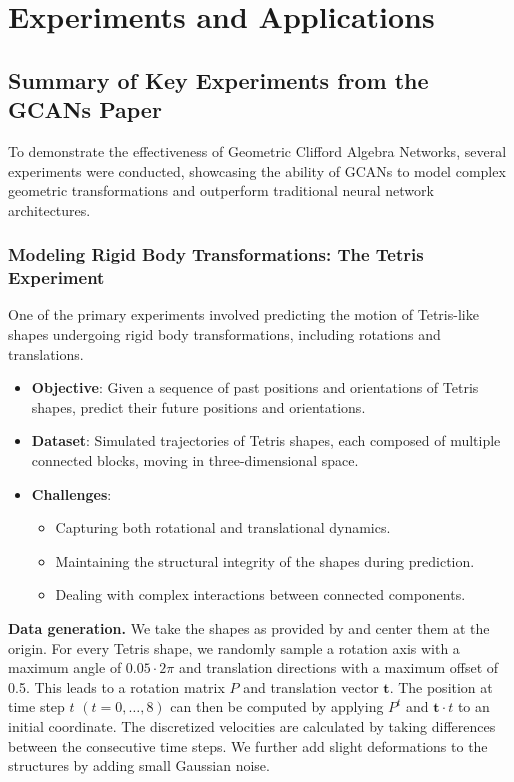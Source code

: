 \documentclass[a4paper,14pt]{article}
\theoremstyle{plain} %
\theoremstyle{definition} %
\theoremstyle{remark} %
\theoremstyle{definition}
\theoremstyle{remark}
\theoremstyle{remark}
\begin{document}
	\section{Experiments and Applications}
	
	\subsection{Summary of Key Experiments from the GCANs Paper}
	
	To demonstrate the effectiveness of Geometric Clifford Algebra Networks, several experiments were conducted, showcasing the ability of GCANs to model complex geometric transformations and outperform traditional neural network architectures.
	
	\subsubsection{Modeling Rigid Body Transformations: The Tetris Experiment}
	
	One of the primary experiments involved predicting the motion of Tetris-like shapes undergoing rigid body transformations, including rotations and translations.
	
	\begin{itemize}
		\item \textbf{Objective}: Given a sequence of past positions and orientations of Tetris shapes, predict their future positions and orientations.
		\item \textbf{Dataset}: Simulated trajectories of Tetris shapes, each composed of multiple connected blocks, moving in three-dimensional space.
		\item \textbf{Challenges}:
		\begin{itemize}
			\item Capturing both rotational and translational dynamics.
			\item Maintaining the structural integrity of the shapes during prediction.
			\item Dealing with complex interactions between connected components.
		\end{itemize}
	\end{itemize}
	
	\textbf{Data generation.} We take the shapes as provided by \cite{Thomas2018} and center them at the origin. For every Tetris shape, we randomly sample a rotation axis with a maximum angle of $0.05 \cdot 2\pi$ and translation directions with a maximum offset of 0.5. This leads to a rotation matrix $P$ and translation vector $\mathbf{t}$. The position at time step $t$ $(t = 0, \dots, 8)$ can then be computed by applying $P^t$ and $\mathbf{t} \cdot t$ to an initial coordinate. The discretized velocities are calculated by taking differences between the consecutive time steps. We further add slight deformations to the structures by adding small Gaussian noise.
	
\end{document}
